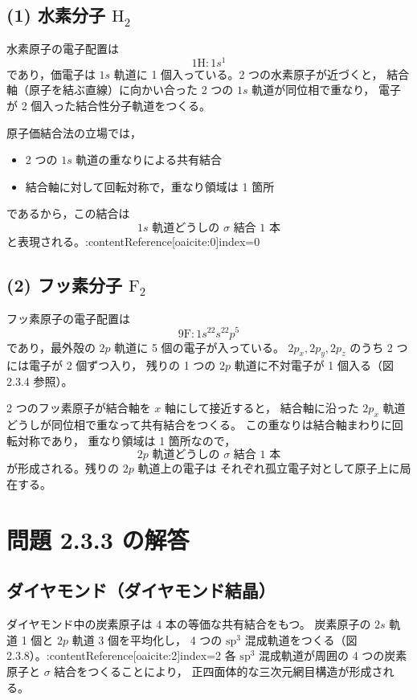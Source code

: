 \documentclass[a4paper,12pt]{jlreq}
\begin{document}
\subsection*{(1) 水素分子 \(\mathrm{H_2}\)}

水素原子の電子配置は
\[
1\mathrm{H}: 1s^1
\]
であり，価電子は \(1s\) 軌道に 1 個入っている。2 つの水素原子が近づくと，
結合軸（原子を結ぶ直線）に向かい合った 2 つの \(1s\) 軌道が同位相で重なり，
電子が 2 個入った結合性分子軌道をつくる。

原子価結合法の立場では，
\begin{itemize}
  \item 2 つの \(1s\) 軌道の重なりによる共有結合
  \item 結合軸に対して回転対称で，重なり領域は 1 箇所
\end{itemize}
であるから，この結合は
\[
\boxed{\text{\(1s\) 軌道どうしの \(\sigma\) 結合 1 本}}
\]
と表現される。:contentReference[oaicite:0]{index=0}

\subsection*{(2) フッ素分子 \(\mathrm{F_2}\)}

フッ素原子の電子配置は
\[
9\mathrm{F}: 1s^22s^22p^5
\]
であり，最外殻の \(2p\) 軌道に 5 個の電子が入っている。
\(2p_x,2p_y,2p_z\) のうち 2 つには電子が 2 個ずつ入り，
残りの 1 つの \(2p\) 軌道に不対電子が 1 個入る（図 2.3.4 参照）。

2 つのフッ素原子が結合軸を \(x\) 軸にして接近すると，
結合軸に沿った \(2p_x\) 軌道どうしが同位相で重なって共有結合をつくる。
この重なりは結合軸まわりに回転対称であり，
重なり領域は 1 箇所なので，
\[
\boxed{\text{\(2p\) 軌道どうしの \(\sigma\) 結合 1 本}}
\]
が形成される。残りの \(2p\) 軌道上の電子は
それぞれ孤立電子対として原子上に局在する。


\section*{問題 2.3.3 の解答}

\subsection*{ダイヤモンド（ダイヤモンド結晶）}

ダイヤモンド中の炭素原子は 4 本の等価な共有結合をもつ。
炭素原子の \(2s\) 軌道 1 個と \(2p\) 軌道 3 個を平均化し，
4 つの \(\mathrm{sp^3}\) 混成軌道をつくる（図 2.3.8）。:contentReference[oaicite:2]{index=2}
各 \(\mathrm{sp^3}\) 混成軌道が周囲の 4 つの炭素原子と
\(\sigma\) 結合をつくることにより，
正四面体的な三次元網目構造が形成される。
\end{document}
